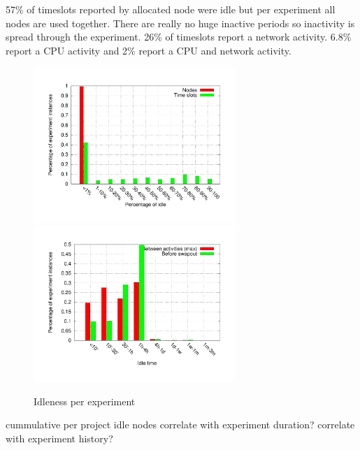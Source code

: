 57\% of timeslots reported by allocated node were idle but per
experiment all nodes are used together. There are really no huge
inactive periods so inactivity is spread through the experiment. 26\% of
timeslots report a network activity. 6.8\% report a CPU activity and 2\%
report a CPU and network activity.

\begin{figure}[htbp] \begin{center} \includegraphics[width=3in,
type=pdf,ext=.pdf,read=.pdf]{figs/exp.idle.gnu}
\includegraphics[width=3in,
type=pdf,ext=.pdf,read=.pdf]{figs/period.idle.gnu} \caption{Idleness per
experiment} \label{idle} \end{center} \end{figure}


cummulative per project idle nodes correlate with experiment duration?
correlate with experiment history?


